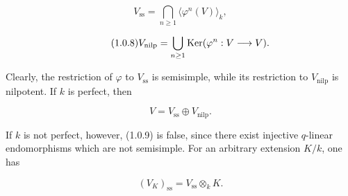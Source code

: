 \begin{equation}\tag{1.0.7}
V_{\mathrm{ss}}=
\bigcap_{n\geq1}\langle\varphi^n(V)\rangle_k,
\end{equation}

\begin{equation}\tag{1.0.8}
V_{\mathrm{nilp}}=
\bigcup_{n\geq1}\operatorname{Ker}(\varphi^n:V\longrightarrow V).
\end{equation}

Clearly, the restriction of $\varphi$ to $V_{\mathrm{ss}}$ is semisimple,
while its restriction to $V_{\mathrm{nilp}}$ is nilpotent. If $k$ is
perfect, then

\begin{equation}\tag{1.0.9}
V=V_{\mathrm{ss}}\oplus V_{\mathrm{nilp}}.
\end{equation}

If $k$ is not perfect, however, (1.0.9) is false, since there exist injective
$q$-linear endomorphisms which are not semisimple. For an arbitrary extension
$K/k$, one has

\begin{equation}\tag{1.0.10}
(V_K)_{\mathrm{ss}}=V_{\mathrm{ss}}\otimes_kK.
\end{equation}

